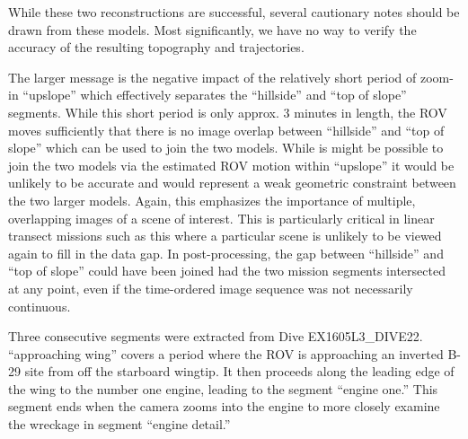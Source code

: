 \documentclass[letterpaper,12pt]{article}
\begin{document}
While these two reconstructions are successful, several cautionary notes should be drawn from these models.   Most significantly, we have no way to verify the accuracy of the resulting topography and trajectories.  

The larger message is the negative impact of the relatively short period of zoom-in ``upslope'' which effectively separates the ``hillside'' and ``top of slope'' segments.  While this short period is only approx. 3 minutes in length, the ROV moves sufficiently that there is no image overlap between ``hillside'' and ``top of slope'' which can be used to join the two models.  While is might be possible to join the two models via the estimated ROV motion within ``upslope'' it would be unlikely to be accurate and would represent a weak geometric constraint between the two larger models.   Again, this emphasizes the importance of multiple, overlapping images of a scene of interest.  This is particularly critical in linear transect missions such as this where a particular scene is unlikely to be viewed again to fill in the data gap.    In post-processing, the gap between ``hillside'' and ``top of slope'' could have been joined had the two mission segments intersected at any point, even if the time-ordered image sequence was not necessarily continuous.

\clearpage

Three consecutive segments were extracted from Dive EX1605L3\_DIVE22. ``approaching wing'' covers a period where the ROV is approaching an inverted B-29 site from off the starboard wingtip.  It then proceeds along the leading edge of the wing to the number one engine, leading to the segment ``engine one.''  This segment ends when the camera zooms into the engine to more closely examine the wreckage in segment ``engine detail.''
\end{document}
